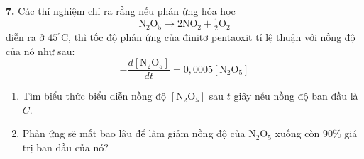 \begin{minipage}[t]{0.485\textwidth}
\vspace{8pt}
\textbf{7.} Các thí nghiệm chỉ ra rằng nếu phản ứng hóa học
\[
    \mathrm{N}_2\mathrm{O}_5 \to 2\mathrm{NO}_2 + \tfrac{1}{2}\mathrm{O}_2
\]
diễn ra ở $45^\circ\text{C}$, thì tốc độ phản ứng của đinitơ pentaoxit tỉ lệ thuận với nồng độ của nó như sau:
\[
    -\frac{d[\mathrm{N}_2\mathrm{O}_5]}{dt} = 0{,}0005[\mathrm{N}_2\mathrm{O}_5]
\]
\begin{enumerate}[label=(\alph*), leftmargin=16pt, itemsep=3pt, topsep=2pt]
    \item Tìm biểu thức biểu diễn nồng độ $[\mathrm{N}_2\mathrm{O}_5]$ sau $t$ giây nếu nồng độ ban đầu là $C$.
    \item Phản ứng sẽ mất bao lâu để làm giảm nồng độ của $\mathrm{N}_2\mathrm{O}_5$ xuống còn $90\%$ giá trị ban đầu của nó?
\end{enumerate}

\end{minipage}
